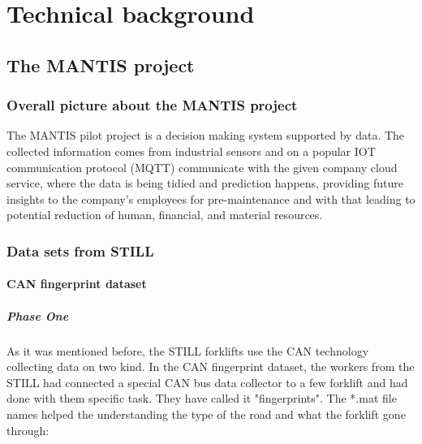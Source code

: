 \chapter{Technical background}
	\section{The MANTIS project}
		\subsection{Overall picture about the MANTIS project}
The MANTIS pilot project is a decision making system supported by data. The collected information comes from industrial sensors and on a popular IOT communication protocol (MQTT) communicate with the given company cloud service, where the data is being tidied and prediction happens, providing future insights to the company's employees for pre-maintenance and with that leading to potential reduction of human, financial, and material resources.\cite{Mantis}

		\subsection{Data sets from STILL}
			\subsubsection{CAN fingerprint dataset}
				\paragraph{Phase One}
				\noindent
As it was mentioned before, the STILL forklifts use the CAN technology collecting data on two kind. In the CAN fingerprint dataset, the workers from the STILL had  connected a special CAN bus data collector to a few forklift and had done with them specific task. They have called it "fingerprints". The *.mat file names helped the understanding the type of the road and what the forklift gone through:

